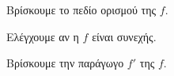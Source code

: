 \begin{bhma}
\item Βρίσκουμε το πεδίο ορισμού της $ f $.
\item Ελέγχουμε αν η $ f $ είναι συνεχής.
\item Βρίσκουμε την παράγωγο $ f' $ της $ f $.
\item 
\end{bhma}
